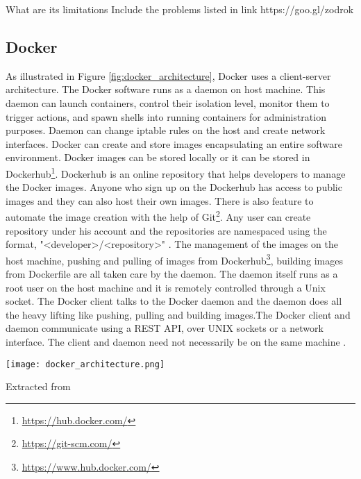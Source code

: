 What are its limitations
Include the problems listed in link https://goo.gl/zodrok

\subsection{Docker}
As illustrated in Figure \ref{fig:docker_architecture}, Docker uses a client-server architecture. The Docker software runs as a daemon on host machine. This daemon can launch containers, control their isolation level, monitor them to trigger actions, and spawn shells into running containers for administration purposes. Daemon can change iptable rules on the host and create network interfaces. Docker can create and store images encapsulating an entire software environment. Docker images can be stored locally or it can be stored in Dockerhub\footnote{\url{https://hub.docker.com/}}. Dockerhub is an online repository that helps developers to manage the Docker images. Anyone who sign up on the Dockerhub has access to public images and they can also host their own images. There is also feature to automate the image creation with the help of Git\footnote{\url{https://git-scm.com/}}. Any user can create repository under his account and the repositories are namespaced using the format, "\textless developer\textgreater/\textless repository\textgreater" \cite{7742298}. The management of the images on the host machine, pushing and pulling of images from Dockerhub\footnote{\url{https://www.hub.docker.com/}}, building images from Dockerfile are all taken care by the daemon. The daemon itself runs as a root user on the host machine and it is remotely controlled through a Unix socket. The Docker client talks to the Docker daemon and the daemon does all the heavy lifting like pushing, pulling and building images.The Docker client and daemon communicate using a REST API, over UNIX sockets or a network interface. The client and daemon need not necessarily be on the same machine \cite{docker-documentation}.

\begin{center}
\texttt{[image: docker\_architecture.png]}
\label{fig:docker_architecture}
\caption*{Extracted from \cite{docker-documentation}}
\end{center}


